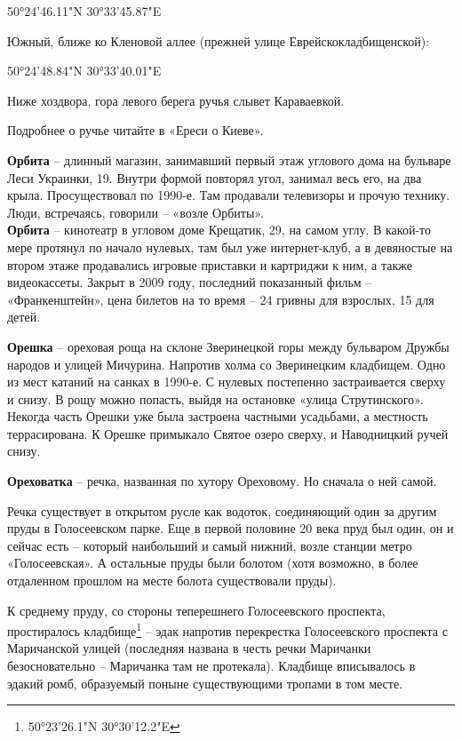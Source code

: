 50°24'46.11"N 30°33'45.87"E

Южный, ближе ко Кленовой аллее (прежней улице Еврейскокладбищенской):

50°24'48.84"N 30°33'40.01"E

Ниже хоздвора, гора левого берега ручья слывет Караваевкой.

Подробнее о ручье читайте в «Ереси о Киеве».

\newpage

\textbf{Орбита} – длинный магазин, занимавший первый этаж углового дома на бульваре Леси Украинки, 19. Внутри формой повторял угол, занимал весь его, на два крыла. Просуществовал по 1990-е. Там продавали телевизоры и прочую технику. Люди, встречаясь, говорили – «возле Орбиты».\\

\textbf{Орбита} – кинотеатр в угловом доме Крещатик, 29, на самом углу. В какой-то мере протянул по начало нулевых, там был уже интернет-клуб, а в девяностые на втором этаже продавались игровые приставки и картриджи к ним, а также видеокассеты. Закрыт в 2009 году, последний показанный фильм – «Франкенштейн», цена билетов на то время – 24 гривны для взрослых, 15 для детей.\\

\medskip

\textbf{Орешка} – ореховая роща на склоне Зверинецкой горы между бульваром Дружбы народов и улицей Мичурина. Напротив холма со Зверинецким кладбищем. Одно из мест катаний на санках в 1990-е. С нулевых постепенно застраивается сверху и снизу. В рощу можно попасть, выйдя на остановке «улица Струтинского». Некогда часть Орешки уже была застроена частными усадьбами, а местность террасирована. К Орешке примыкало Святое озеро сверху, и Наводницкий ручей снизу.\\

\newpage

\textbf{Ореховатка} – речка, названная по хутору Ореховому. Но сначала о ней самой.

Речка существует в открытом русле как водоток, соединяющий один за другим пруды в Голосеевском парке. Еще в первой половине 20 века пруд был один, он и сейчас есть – который наибольший и самый нижний, возле станции метро «Голосеевская». А остальные пруды были болотом (хотя возможно, в более отдаленном прошлом на месте болота существовали пруды).

К среднему пруду, со стороны теперешнего Голосеевского проспекта, простиралось кладбище\footnote{50°23'26.1"N 30°30'12.2"E} – эдак напротив перекрестка Голосеевского проспекта с Маричанской улицей (последняя названа в честь речки Маричанки безосновательно – Маричанка там не протекала). Кладбище вписывалось в эдакий ромб, образуемый поныне существующими тропами в том месте.

